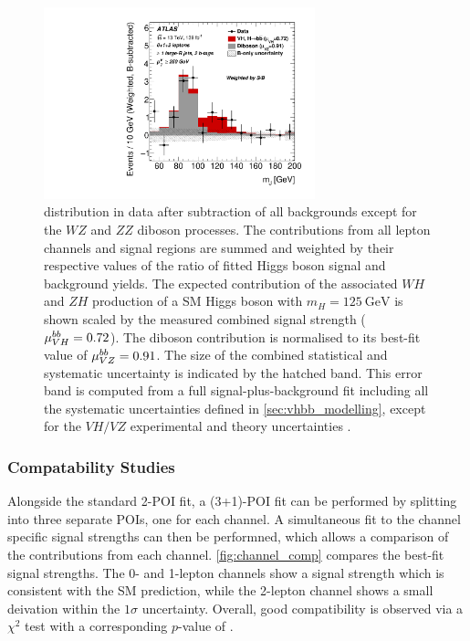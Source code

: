 \begin{figure}[!htbp]
  \centering
  \includegraphics[width=0.7\textwidth]{chapters/6.vhbb_boosted/figs/Region_BMin250_incFat1_Fat1_incJet1_Y6051_DSRnoaddbjetsr_T2_L3_distmBB_Higgsweighted_BkgSub_GlobalFit_unconditionnal_mu1.pdf}
  \caption{
    \mJ distribution in data after subtraction of all backgrounds except for the $WZ$ and $ZZ$ diboson processes. 
    The contributions from all lepton channels and signal regions are summed and weighted by their
    respective values of the ratio of fitted Higgs boson signal and
    background yields. The expected contribution of the associated $WH$
    and $ZH$ production of a SM Higgs boson with $m_H = \SI{125}{\GeV}$ is
    shown scaled by the measured combined signal strength
    ($\mu_{VH}^{bb}=0.72$). The diboson contribution is normalised to its
    best-fit value of $\mu_{VZ}^{bb}=0.91$. The size of the combined
    statistical and systematic uncertainty is indicated by the hatched
    band. This error band is computed from a full signal-plus-background
    fit including all the systematic uncertainties defined in
    \cref{sec:vhbb_modelling}, except for the $VH/VZ$
    experimental and theory uncertainties  \cite{HIGG-2018-52}.  
  }
  \label{fig:money_plot}
\end{figure}

\subsubsection{Compatability Studies}

Alongside the standard 2-POI fit, a (3+1)-POI fit can be performed by splitting \muVH into three separate POIs, one for each channel.
A simultaneous fit to the channel specific signal strengths can then be performned, which allows a comparison of the contributions from each channel.
\cref{fig:channel_comp} compares the best-fit signal strengths.
The 0- and 1-lepton channels show a signal strength which is consistent with the SM prediction, while the 2-lepton channel shows a small deivation within the $1\sigma$ uncertainty.
Overall, good compatibility is observed via a $\chi^2$ test with a corresponding $p$-value of .

